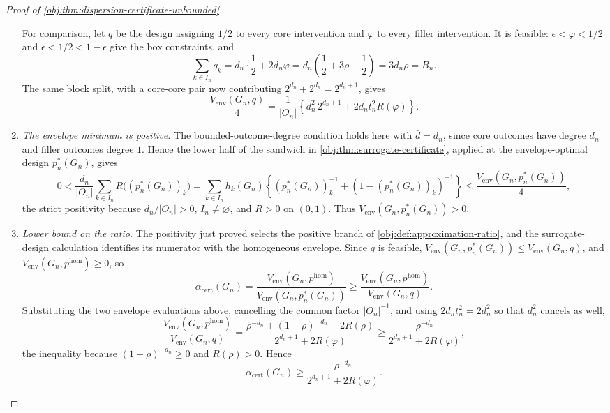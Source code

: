 \begin{proof}[Proof of \cref{obj:thm:dispersion-certificate-unbounded}]
\begin{enumerate}
For comparison, let \(q\) be the design assigning \(1/2\) to every core intervention and \(\varphi\) to every filler intervention.  It is feasible: \(\epsilon<\varphi<1/2\) and \(\epsilon<1/2<1-\epsilon\) give the box constraints, and
\[
\sum_{k\in I_n}q_k=d_n\cdot\frac12+2d_n\varphi
=d_n\left(\frac12+3\rho-\frac12\right)=3d_n\rho=B_n .
\]
The same block split, with a core-core pair now contributing \(2^{d_n}+2^{d_n}=2^{d_n+1}\), gives
\[
\frac{V_{\mathrm{env}}(G_n,q)}{4}
=\frac{1}{|O_n|}
\left\{
d_n^2\,2^{d_n+1}
+2d_nt_n^2R(\varphi)
\right\}.
\]

\item \textit{The envelope minimum is positive.}  The bounded-outcome-degree condition holds here with \(\bar d=d_n\), since core outcomes have degree \(d_n\) and filler outcomes degree \(1\).  Hence the lower half of the sandwich in \cref{obj:thm:surrogate-certificate}, applied at the envelope-optimal design \(p_n^*(G_n)\), gives
\[
0<\frac{d_n}{|O_n|}\sum_{k\in I_n}R\bigl((p_n^*(G_n))_k\bigr)
=\sum_{k\in I_n}h_k(G_n)\left\{(p_n^*(G_n))_k^{-1}+(1-(p_n^*(G_n))_k)^{-1}\right\}
\leq\frac{V_{\mathrm{env}}(G_n,p_n^*(G_n))}{4},
\]
the strict positivity because \(d_n/|O_n|>0\), \(I_n\neq\varnothing\), and \(R>0\) on \((0,1)\).  Thus
\(V_{\mathrm{env}}(G_n,p_n^*(G_n))>0\).

\item \textit{Lower bound on the ratio.}  The positivity just proved selects the positive branch of \cref{obj:def:approximation-ratio}, and the surrogate-design calculation identifies its numerator with the homogeneous envelope.  Since \(q\) is feasible, \(V_{\mathrm{env}}(G_n,p_n^*(G_n))\le V_{\mathrm{env}}(G_n,q)\), and \(V_{\mathrm{env}}(G_n,p^{\mathrm{hom}})\ge0\), so
\[
\alpha_{\mathrm{cert}}(G_n)
=\frac{V_{\mathrm{env}}(G_n,p^{\mathrm{hom}})}{V_{\mathrm{env}}(G_n,p_n^*(G_n))}
\geq
\frac{V_{\mathrm{env}}(G_n,p^{\mathrm{hom}})}{V_{\mathrm{env}}(G_n,q)} .
\]
Substituting the two envelope evaluations above, cancelling the common factor \(|O_n|^{-1}\), and using \(2d_nt_n^2=2d_n^2\) so that \(d_n^2\) cancels as well,
\[
\frac{V_{\mathrm{env}}(G_n,p^{\mathrm{hom}})}{V_{\mathrm{env}}(G_n,q)}
=\frac{\rho^{-d_n}+(1-\rho)^{-d_n}+2R(\rho)}
      {2^{d_n+1}+2R(\varphi)}
\geq
\frac{\rho^{-d_n}}
 {2^{d_n+1}+2R(\varphi)},
\]
the inequality because \((1-\rho)^{-d_n}\ge0\) and \(R(\rho)>0\).  Hence
\[
\alpha_{\mathrm{cert}}(G_n)\geq
\frac{\rho^{-d_n}}
 {2^{d_n+1}+2R(\varphi)} .
\]


\end{enumerate}
\end{proof}
